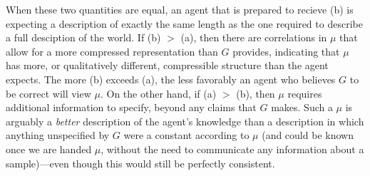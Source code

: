 \documentclass{article}
\theoremstyle{plain}
\theoremstyle{definition}
\theoremstyle{remark}
\numberwithin{equation}{section}
\begin{document}
When these two quantities are equal, an agent that
is prepared to recieve
(b) is expecting a description of exactly the same length as
the one required to describe a full desciption of the world.
%
%
If (b) $>$ (a), then there are correlations in $\mu$ that allow for a more
compressed representation than $G$ provides, indicating that $\mu$ has more, or
qualitatively different, compressible structure than the agent expects. 
The more (b) exceeds (a), the less favorably an agent who believes $G$ to be correct will view $\mu$. On the other hand, if (a) $>$ (b), then $\mu$ requires additional information to specify, beyond any claims that $G$ makes. Such a $\mu$ is arguably a \emph{better} description of the agent's knowledge than a description in which anything unspecified by $G$ were a constant according to $\mu$ (and could be known once we are handed $\mu$, without the need to communicate any information about a sample)---even though this would still be perfectly consistent. 
\end{document}
